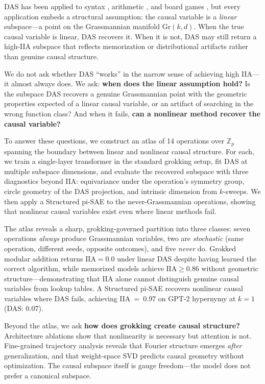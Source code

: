 \documentclass{article}
\newcommand{\Gr}{\mathrm{Gr}}
\newcommand{\IIA}{\mathrm{IIA}}
\newcommand{\Z}{\mathbb{Z}}
\begin{document}
DAS has been applied to syntax \citep{geiger2023finding}, arithmetic
\citep{wu2024interpretability}, and board games \citep{li2023emergent}, but
every application embeds a structural assumption: the causal variable is a
\emph{linear} subspace---a point on the Grassmannian manifold $\Gr(k,d)$. When
the true causal variable is linear, DAS recovers it. When it is not, DAS may
still return a high-IIA subspace that reflects memorization or distributional
artifacts rather than genuine causal structure.

We do not ask whether DAS ``works'' in the narrow sense of achieving high IIA---it
almost always does. We ask: \textbf{when does the linear assumption hold?} Is the
subspace DAS recovers a genuine Grassmannian point with the geometric properties
expected of a linear causal variable, or an artifact of searching in the wrong
function class? And when it fails, \textbf{can a nonlinear method recover the
causal variable?}

To answer these questions, we construct an atlas of 14 operations over $\Z_p$
spanning the boundary between linear and nonlinear causal structure. For each, we
train a single-layer transformer in the standard grokking setup, fit DAS at
multiple subspace dimensions, and evaluate the recovered subspace with three
diagnostics beyond IIA: equivariance under the operation's symmetry group, circle
geometry of the DAS projection, and intrinsic dimension from $k$-sweeps. We then
apply a Structured pi-SAE \citep{narayanaswamy2017learning} to the
never-Grassmannian operations, showing that nonlinear causal variables exist even
where linear methods fail.

The atlas reveals a sharp, grokking-governed partition into three classes:
seven operations \emph{always} produce Grassmannian variables, two are
\emph{stochastic} (same operation, different seeds, opposite outcomes), and
five \emph{never} do. Grokked modular addition returns $\IIA = 0.0$ under
linear DAS despite having learned the correct algorithm, while memorized
models achieve $\IIA \geq 0.86$ without geometric structure---demonstrating
that IIA alone cannot distinguish genuine causal variables from lookup tables.
A Structured pi-SAE recovers nonlinear causal variables where DAS fails,
achieving IIA~=~0.97 on GPT-2 hypernymy at $k{=}1$ (DAS: 0.07).

Beyond the atlas, we ask \textbf{how does grokking create causal structure?}
Architecture ablations show that nonlinearity is necessary but attention is
not. Fine-grained trajectory analysis reveals that Fourier structure emerges
\emph{after} generalization, and that weight-space SVD predicts causal
geometry without optimization. The causal subspace itself is gauge
freedom---the model does not prefer a canonical subspace.
\end{document}
